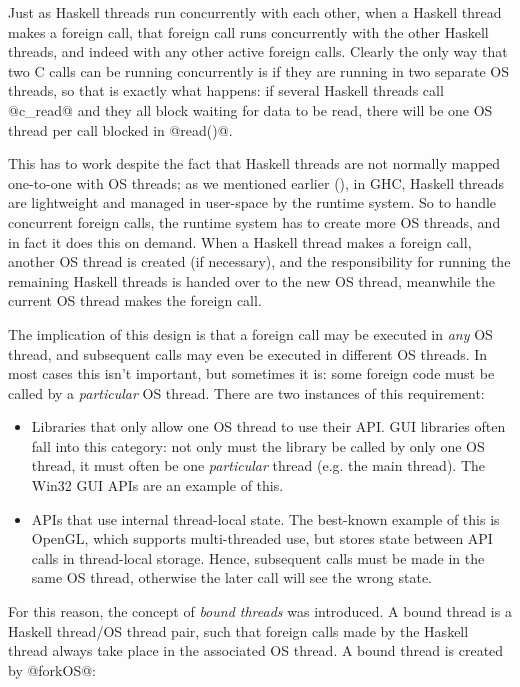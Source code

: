 Just as Haskell threads run concurrently with each other, when a
Haskell thread makes a foreign call, that foreign call runs
concurrently with the other Haskell threads, and indeed with any other
active foreign calls.  Clearly the only way that two C calls can be
running concurrently is if they are running in two separate OS
threads, so that is exactly what happens: if several Haskell threads
call @c_read@ and they all block waiting for data to be read, there
will be one OS thread per call blocked in @read()@.

This has to work despite the fact that Haskell threads are not
normally mapped one-to-one with OS threads; as we mentioned earlier
(), in GHC, Haskell threads are lightweight and
managed in user-space by the runtime system.  So to handle concurrent
foreign calls, the runtime system has to create more OS threads, and
in fact it does this on demand.  When a Haskell thread makes a foreign
call, another OS thread is created (if necessary), and the
responsibility for running the remaining Haskell threads is handed
over to the new OS thread, meanwhile the current OS thread makes the
foreign call.

The implication of this design is that a foreign call may be executed
in \emph{any} OS thread, and subsequent calls may even be executed in
different OS threads. In most cases this isn't important, but
sometimes it is: some foreign code must be called by a \emph{particular}
OS thread.  There are two instances of this requirement:

\begin{itemize}
\item Libraries that only allow one OS thread to use their API.  GUI
  libraries often fall into this category: not only must the library
  be called by only one OS thread, it must often be one
  \emph{particular} thread (e.g. the main thread).  The Win32 GUI APIs
  are an example of this.

\item APIs that use internal thread-local state.  The best-known
  example of this is OpenGL, which supports multi-threaded use, but
  stores state between API calls in thread-local storage.  Hence,
  subsequent calls must be made in the same OS thread, otherwise the
  later call will see the wrong state.
\end{itemize}

For this reason, the concept of \emph{bound threads} was introduced.
A bound thread is a Haskell thread/OS thread pair, such that foreign
calls made by the Haskell thread always take place in the associated
OS thread.  A bound thread is created by @forkOS@:

